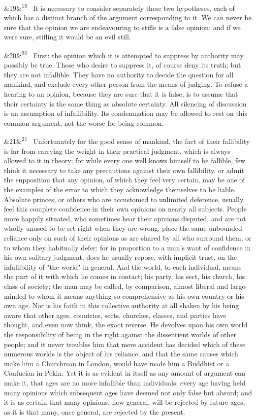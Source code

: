 \documentclass[12pt]{article}
\newcommand{\para}[1][]{\par\noindent\ifx&#1&\else\textsuperscript{\footnotesize #1}~\fi}
\begin{document}
\para[19] It is necessary to consider separately these two hypotheses, each of which has a distinct branch of the argument corresponding to it. We can never be sure that the opinion we are endeavouring to stifle is a false opinion; and if we were sure, stifling it would be an evil still.

\para[20] First: the opinion which it is attempted to suppress by authority may possibly be true. Those who desire to suppress it, of course deny its truth; but they are not infallible. They have no authority to decide the question for all mankind, and exclude every other person from the means of judging. To refuse a hearing to an opinion, because they are sure that it is false, is to assume that their certainty is the same thing as absolute certainty. All silencing of discussion is an assumption of infallibility. Its condemnation may be allowed to rest on this common argument, not the worse for being common.

\para[21] Unfortunately for the good sense of mankind, the fact of their fallibility is far from carrying the weight in their practical judgment, which is always allowed to it in theory; for while every one well knows himself to be fallible, few think it necessary to take any precautions against their own fallibility, or admit the supposition that any opinion, of which they feel very certain, may be one of the examples of the error to which they acknowledge themselves to be liable. Absolute princes, or others who are accustomed to unlimited deference, usually feel this complete confidence in their own opinions on nearly all subjects. People more happily situated, who sometimes hear their opinions disputed, and are not wholly unused to be set right when they are wrong, place the same unbounded reliance only on such of their opinions as are shared by all who surround them, or to whom they habitually defer: for in proportion to a man's want of confidence in his own solitary judgment, does he usually repose, with implicit trust, on the infallibility of "the world" in general. And the world, to each individual, means the part of it with which he comes in contact; his party, his sect, his church, his class of society: the man may be called, by comparison, almost liberal and large-minded to whom it means anything so comprehensive as his own country or his own age. Nor is his faith in this collective authority at all shaken by his being aware that other ages, countries, sects, churches, classes, and parties have thought, and even now think, the exact reverse. He devolves upon his own world the responsibility of being in the right against the dissentient worlds of other people; and it never troubles him that mere accident has decided which of these numerous worlds is the object of his reliance, and that the same causes which make him a Churchman in London, would have made him a Buddhist or a Confucian in Pekin. Yet it is as evident in itself as any amount of argument can make it, that ages are no more infallible than individuals; every age having held many opinions which subsequent ages have deemed not only false but absurd; and it is as certain that many opinions, now general, will be rejected by future ages, as it is that many, once general, are rejected by the present.
\end{document}
